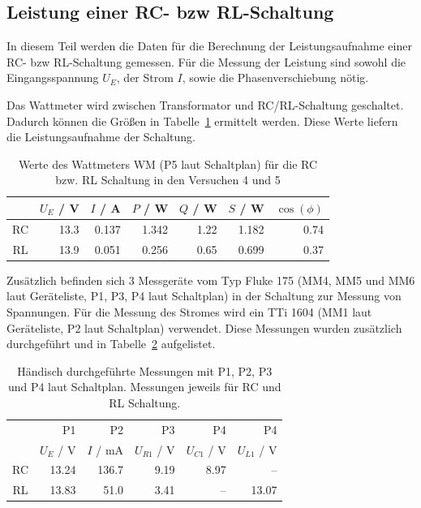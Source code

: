 \documentclass{article}
\begin{document}
\subsection{Leistung einer RC- bzw RL-Schaltung}

In diesem Teil werden die Daten für die Berechnung der Leistungsaufnahme einer RC- bzw RL-Schaltung gemessen. Für die Messung der Leistung sind sowohl die Eingangsspannung $U_E$, der Strom $I$, sowie die Phasenverschiebung nötig.

Das Wattmeter wird zwischen Transformator und RC/RL-Schaltung geschaltet. Dadurch können die Größen in Tabelle~\ref{tab:task45_wattmeter} ermittelt werden. Diese Werte liefern die Leistungsaufnahme der Schaltung. 

\begin{table}[H]
\caption{Werte des Wattmeters WM (P5 laut Schaltplan) für die RC bzw. RL Schaltung in den Versuchen 4 und 5}
\label{tab:task45_wattmeter}

\begin{tabular}{c|rrrrrr}
& $U_E$ / V & $I$ / A & $P$ / W & $Q$ / W & $S$ / W & $\cos(\phi)$ \\
\hline 
RC & 13.3 & 0.137 & 1.342 & 1.22 & 1.182 & 0.74 \\
RL & 13.9 & 0.051 & 0.256 & 0.65 & 0.699 & 0.37
\end{tabular}
\end{table}





Zusätzlich befinden sich 3 Messgeräte vom Typ Fluke 175 (MM4, MM5 und MM6 laut Geräteliste, P1, P3, P4 laut Schaltplan) in der Schaltung zur Messung von Spannungen. Für die Messung des Stromes wird ein TTi 1604 (MM1 laut Geräteliste, P2 laut Schaltplan) verwendet. Diese Messungen wurden zusätzlich durchgeführt und in Tabelle~\ref{tab:task45_messungen} aufgelistet.


\begin{table}[H]
\caption{Händisch durchgeführte Messungen mit P1, P2, P3 und P4 laut Schaltplan. Messungen jeweils für RC und RL Schaltung.}
\label{tab:task45_messungen}

\begin{tabular}{c|rrrrr}
& P1 & P2 & P3 & P4 & P4 \\
& $U_E$ / V & $I$ / mA & $U_{R1}$ / V & $U_{C1}$ / V & $U_{L1}$ / V \\
\hline 
RC & 13.24 & 136.7 & 9.19 & 8.97 & -- \\
RL & 13.83 & 51.0 & 3.41 &  -- & 13.07
\end{tabular}
\end{table}
\end{document}

